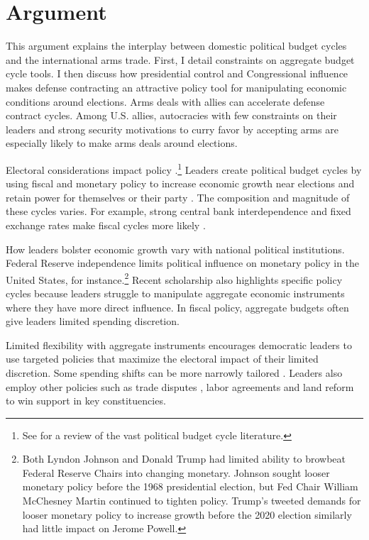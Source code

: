 \documentclass[12pt]{article}
\begin{document}
\section{Argument}


This argument explains the interplay between domestic political budget cycles and the international arms trade. 
First, I detail constraints on aggregate budget cycle tools.
I then discuss how presidential control and Congressional influence makes defense contracting an attractive policy tool for manipulating economic conditions around elections. 
Arms deals with allies can accelerate defense contract cycles. 
Among U.S. allies, autocracies with few constraints on their leaders and strong security motivations to curry favor by accepting arms are especially likely to make arms deals around elections.


Electoral considerations impact policy \citep{Nordhaus1975}.\footnote{See \citet{Dubois2016} for a review of the vast political budget cycle literature.} 
Leaders create political budget cycles by using fiscal and monetary policy to increase economic growth near elections and retain power for themselves or their party \citep{Tufte1978, Rogoff1987}. 
The composition and magnitude of these cycles varies. 
For example, strong central bank interdependence and fixed exchange rates make fiscal cycles more likely \citep{ClarkHallerberg2000}. 


How leaders bolster economic growth vary with national political institutions. 
Federal Reserve independence limits political influence on monetary policy in the United States, for instance.\footnote{Both Lyndon Johnson and Donald Trump had limited ability to browbeat Federal Reserve Chairs into changing monetary. 
Johnson sought looser monetary policy before the 1968 presidential election, but Fed Chair William McChesney Martin continued to tighten policy.
Trump's tweeted demands for looser monetary policy to increase growth before the 2020 election similarly had little impact on Jerome Powell.}
Recent scholarship also highlights specific policy cycles because leaders struggle to manipulate aggregate economic instruments where they have more direct influence. 
In fiscal policy, aggregate budgets often give leaders limited spending discretion.


Limited flexibility with aggregate instruments encourages democratic leaders to use targeted policies that maximize the electoral impact of their limited discretion.
Some spending shifts can be more narrowly tailored \citep[pg. 248]{Dubois2016}.
Leaders also employ other policies such as trade disputes \citep{Conconietal2017}, labor agreements \citep{Ahlquist2010} and land reform \citep{Philips2020} to win support in key constituencies.
\end{document}

